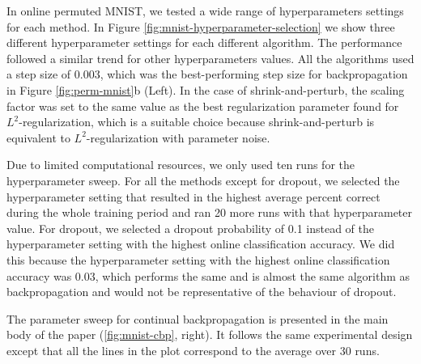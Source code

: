 \documentclass[review, number,3p]{elsarticle}
\begin{document}
In online permuted MNIST, we tested a wide range of hyperparameters settings for each method.
In Figure \ref{fig:mnist-hyperparameter-selection} we show three different hyperparameter settings for each different algorithm.
The performance followed a similar trend for other hyperparameters values.
All the algorithms used a step size of 0.003, which was the best-performing step size for backpropagation in Figure \ref{fig:perm-mnist}b (Left).
In the case of shrink-and-perturb, the scaling factor was set to the same value as the best regularization parameter found for $L^2$-regularization, which is a suitable choice because shrink-and-perturb is equivalent to $L^2$-regularization with parameter noise.

Due to limited computational resources, we only used ten runs for the hyperparameter sweep.
For all the methods except for dropout, we selected the hyperparameter setting that resulted in the highest average percent correct during the whole training period and ran 20 more runs with that hyperparameter value.
For dropout, we selected a dropout probability of 0.1 instead of the  hyperparameter setting with the highest online classification accuracy.
We did this because the hyperparameter setting with the highest online classification accuracy was 0.03, which performs the same and is almost the same algorithm as backpropagation and would not be representative of the behaviour of dropout.

The parameter sweep for continual backpropagation is presented in the main body of the paper (\ref{fig:mnist-cbp}, right).
It follows the same experimental design except that all the lines in the plot correspond to the average over 30 runs.
\end{document}
